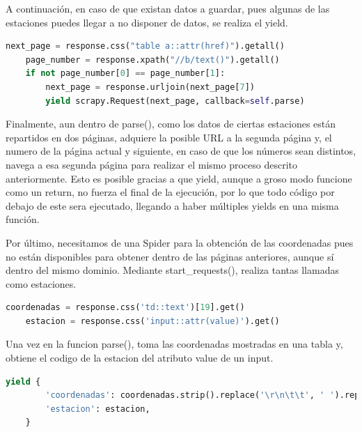 A continuación, en caso de que existan datos a guardar, pues algunas de las estaciones puedes llegar a no disponer de datos, se realiza el yield.

\begin{lstlisting}[language=Python, caption={Navegacion a segunda página de datos en MeteoNavarra Data Spider}]
	next_page = response.css("table a::attr(href)").getall()
	page_number = response.xpath("//b/text()").getall()
	if not page_number[0] == page_number[1]:
		next_page = response.urljoin(next_page[7])
		yield scrapy.Request(next_page, callback=self.parse)
\end{lstlisting}

Finalmente, aun dentro de parse(), como los datos de ciertas estaciones están repartidos en dos páginas, adquiere la posible URL a la segunda página y, el numero de la página actual y siguiente, en caso de que los números sean distintos, navega a esa segunda página para realizar el mismo proceso descrito anteriormente.\newline
\newline
Esto es posible gracias a que yield, aunque a groso modo funcione como un return, no fuerza el final de la ejecución, por lo que todo código por debajo de este sera ejecutado, llegando a haber múltiples yields en una misma función.

Por último, necesitamos de una Spider para la obtención de las coordenadas pues no están disponibles para obtener dentro de las páginas anteriores, aunque sí dentro del mismo dominio.\newline
\newline
Mediante start\_requests(), realiza tantas llamadas como estaciones.

\begin{lstlisting}[language=Python, caption={Selector en parse() de MeteoNavarra Coordenates Spider}]
	coordenadas = response.css('td::text')[19].get()
	estacion = response.css('input::attr(value)').get()
\end{lstlisting}

Una vez en la funcion parse(), toma las coordenadas mostradas en una tabla y, obtiene el codigo de la estacion del atributo value de un input.

\begin{lstlisting}[language=Python, caption={Guardado de datos de MeteoNavarra Coordenates Spider}]
	yield {
		'coordenadas': coordenadas.strip().replace('\r\n\t\t', ' ').replace(' (*)', ''),
		'estacion': estacion,
	}
\end{lstlisting}


